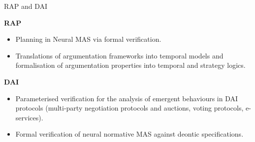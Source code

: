 \documentclass[10pt]{beamer}
\begin{document}

\begin{frame}{RAP and DAI}

{\bf RAP}

\begin{itemize} \itemsep 0.2cm
	\item Planning in Neural MAS via formal verification.
	\item  Translations of argumentation frameworks into temporal
		models and formalisation of argumentation properties into
		temporal and strategy logics.
\end{itemize}

\vspace{1em}

{\bf DAI}
\begin{itemize} \itemsep 0.2cm
	\item Parameterised verification for the analysis of emergent
		behaviours in DAI protocols  (multi-party negotiation
		protocols and auctions, voting protocols, e-services).

	\item Formal verification of neural normative MAS against deontic
		specifications.
\end{itemize}

\end{frame}
\end{document}
